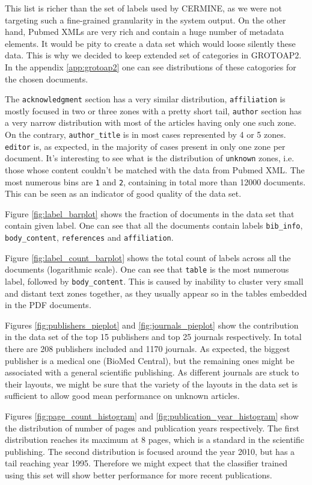 This list is richer than the set of labels used by CERMINE, as we were not targeting such a fine-grained granularity in the system output. On the other hand, Pubmed XMLs are very rich and contain a huge number of metadata elements. It would be pity to create a data set which would loose silently these data. This is why we decided to keep extended set of categories in GROTOAP2. In the appendix \ref{app:grotoap2} one can see distributions of these catogories for the chosen documents.

The \verb+acknowledgment+ section has a very similar distribution, \verb+affiliation+ is mostly focused in two or three zones with a pretty short tail, \verb+author+ section has a very narrow distribution with most of the articles having only one such zone. On the contrary, \verb+author_title+ is in most cases represented by 4 or 5 zones. \verb+editor+ is, as expected, in the majority of cases present in only one zone per document. It's interesting to see what is the distribution of \verb+unknown+ zones, i.e. those whose content couldn't be matched with the data from Pubmed XML. The most numerous bins are \verb+1+ and \verb+2+, containing in total more than 12000 documents. This can be seen as an indicator of good quality of the data set.

Figure \ref{fig:label_barplot} shows the fraction of documents in the data set that contain given label. One can see that all the documents contain labels \verb+bib_info+, \verb+body_content+, \verb+references+ and \verb+affiliation+.

Figure \ref{fig:label_count_barplot} shows the total count of labels across all the documents (logarithmic scale). One can see that \verb+table+ is the most numerous label, followed by \verb+body_content+. This is caused by inability to cluster very small and distant text zones together, as they usually appear so in the tables embedded in the PDF documents.

Figures \ref{fig:publishers_pieplot} and \ref{fig:journals_pieplot} show the contribution in the data set of the top 15 publishers and top 25 journals respectively. In total there are 208 publishers included and 1170 journals. As expected, the biggest publisher is a medical one (BioMed Central), but the remaining ones might be associated with a general scientific publishing. As different journals are stuck to their layouts, we might be sure that the variety of the layouts in the data set is sufficient to allow good mean performance on unknown articles.

Figures \ref{fig:page_count_histogram} and \ref{fig:publication_year_histogram} show the distribution of number of pages and publication years respectively. The first distribution reaches its maximum at 8 pages, which is a standard in the scientific publishing. The second distribution is focused around the year 2010, but has a tail reaching year 1995. Therefore we might expect that the classifier trained using this set will show better performance for more recent publications.

